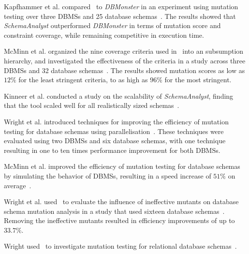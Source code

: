 

Kapfhammer et al. compared \sa~to \textit{DBMonster} in an experiment using mutation testing over
three DBMSs and 25 database schemas~\cite{kapfhammer2013search}. The results showed that \textit{SchemaAnalyst}
outperformed \textit{DBMonster} in terms of mutation score and constraint coverage, while remaining competitive in
execution time.

McMinn et al. organized the nine coverage criteria used in \sa~into an subsumption hierarchy, and
investigated the effectiveness of the criteria in a study across three DBMSs and 32 database
schemas~\cite{mcminn2015effectiveness}.  The results showed mutation scores as low as $12\%$ for the least stringent
criteria, to as high as $96\%$ for the most stringent.

Kinneer et al. conducted a study on the scalability of \textit{SchemaAnalyst}, finding that the tool scaled well for all
realistically sized schemas~\cite{kinneer2015automatically, Kinneer2015a}.

Wright et al. introduced techniques for improving the efficiency of mutation testing for database schemas using
parallelisation~\cite{wright2013efficient}. These techniques were evaluated using two DBMSs and six database schemas,
with one technique resulting in one to ten times performance improvement for both DBMSs.

McMinn et al. improved the efficiency of mutation testing for database schemas by simulating the behavior of DBMSs,
resulting in a speed increase of $51\%$ on average~\cite{mcminn2016virtual}.

Wright et al. used \sa~to evaluate the influence of ineffective mutants on database schema mutation
analysis in a study that used sixteen database schemas~\cite{wright2014impact}. Removing the ineffective mutants
resulted in efficiency improvements of up to $33.7\%$.

Wright used \sa~to investigate mutation testing for relational database
schemas~\cite{wright2015mutation}.

